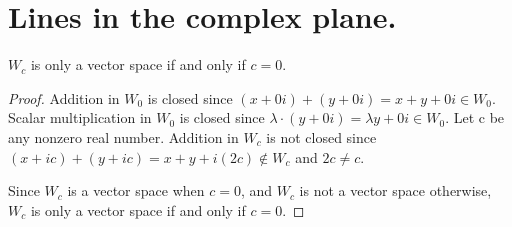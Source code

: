 \section{Lines in the complex plane.}
$W_c$ is only a vector space if and only if $c=0$.
\begin{proof}
    Addition in $W_0$ is closed since
    $(x+0i) + (y+0i) = x+y + 0i \in W_0$.
    Scalar multiplication in $W_0$ is closed since
    $\lambda \cdot (y+0i) = \lambda y + 0i \in W_0$.
    Let c be any nonzero real number.
    Addition in $W_c$ is not closed since
    $(x+ic) + (y+ic) = x+y + i(2c) \not\in W_c$
    and $2c \neq c$.\gap

    Since $W_c$ is a vector space when $c=0$,
    and $W_c$ is not a vector space otherwise,
    $W_c$ is only a vector space if and only if $c=0$.
\end{proof}